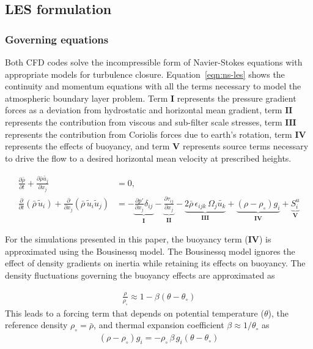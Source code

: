 \subsection{LES formulation}

\subsubsection{Governing equations}
Both CFD codes solve the incompressible form of Navier-Stokes equations with
appropriate models for turbulence closure. Equation~\ref{eqn:ns-les} shows the
continuity and momentum equations with all the terms necessary to model the
atmospheric boundary layer problem. Term $\mathbf{I}$ represents the pressure
gradient forces as a deviation from hydrostatic and horizontal mean gradient,
term $\mathbf{II}$ represents the contribution from viscous and sub-filter scale
stresses, term $\mathbf{III}$ represents the contribution from Coriolis forces
due to earth's rotation, term $\mathbf{IV}$ represents the effects of buoyancy,
and term $\mathbf{V}$ represents source terms necessary to drive the flow to a
desired horizontal mean velocity at prescribed heights.

\begin{align}
  \frac{\partial \bar{\rho}} {\partial t} + \frac{\partial \bar{\rho} \widetilde{u_j}}{\partial x_j} & = 0, \nonumber\\
  \frac{\partial}{\partial t} \left(\bar{\rho}\, \widetilde{u}_i\right) +
  \frac{\partial}{\partial x_j} \left( \bar{\rho}\, \widetilde{u}_i \widetilde{u}_j \right) &=
  - \underbrace{\frac{\partial p'}{\partial x_j} \delta_{ij}}_\mathbf{I}
  - \underbrace{\frac{\partial \tau_{ij}}{\partial x_j}}_\mathbf{II}
  - \underbrace{2\bar{\rho}\,\epsilon_{ijk}\,\Omega_j\widetilde{u_k}}_\mathbf{III}
  + \underbrace{\left(\rho - \rho_\circ \right) g_i}_\mathbf{IV}
  + \underbrace{S^{u}_{i}}_\mathbf{V} \label{eqn:ns-les}
\end{align}

For the simulations presented in this paper, the buoyancy term ($\mathbf{IV}$)
is approximated using the Bousinessq model. The Bousinessq model ignores the
effect of density gradients on inertia while retaining its effects on buoyancy.
The density fluctuations governing the buoyancy effects are approximated as

\begin{align*}
  \frac{\rho}{\rho_\circ} \approx 1 - \beta \left( \theta - \theta_\circ \right)
\end{align*}
This leads to a forcing term that depends on potential temperature ($\theta$),
the reference density $\rho_\circ = \bar{\rho}$, and thermal expansion
coefficient $\beta \approx 1 / \theta_\circ$ as
\begin{align}
  \left(\rho - \rho_\circ \right) g_i = -\rho_\circ\, \beta\, g_i \left( \theta - \theta_\circ \right)
\end{align}

